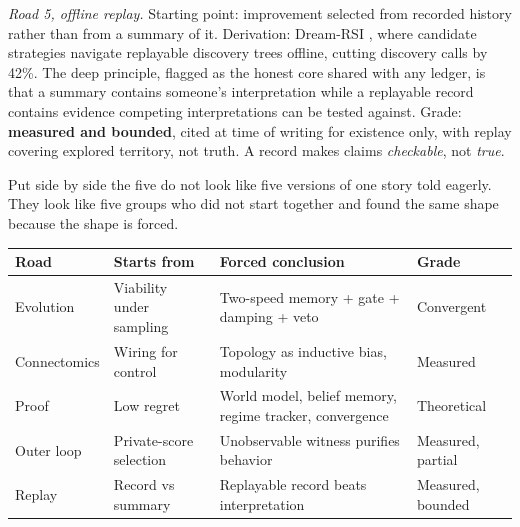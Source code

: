 \textit{Road 5, offline replay.} Starting point: improvement selected from recorded history rather than from a summary of it. Derivation: Dream-RSI \cite{dreamrsi2026}, where candidate strategies navigate replayable discovery trees offline, cutting discovery calls by 42\%. The deep principle, flagged as the honest core shared with any ledger, is that a summary contains someone's interpretation while a replayable record contains evidence competing interpretations can be tested against. Grade: \textbf{measured and bounded}, cited at time of writing for existence only, with replay covering explored territory, not truth. A record makes claims \emph{checkable}, not \emph{true}.

Put side by side the five do not look like five versions of one story told eagerly. They look like five groups who did not start together and found the same shape because the shape is forced.

\begin{center}
\small
\begin{tabular}{p{2.6cm}p{3.8cm}p{3.8cm}p{2.2cm}}
\toprule
Road & Starts from & Forced conclusion & Grade \\
\midrule
Evolution & Viability under sampling & Two-speed memory + gate + damping + veto & Convergent \\
Connectomics & Wiring for control & Topology as inductive bias, modularity & Measured \\
Proof & Low regret & World model, belief memory, regime tracker, convergence & Theoretical \\
Outer loop & Private-score selection & Unobservable witness purifies behavior & Measured, partial \\
Replay & Record vs summary & Replayable record beats interpretation & Measured, bounded \\
\bottomrule
\end{tabular}
\end{center}

